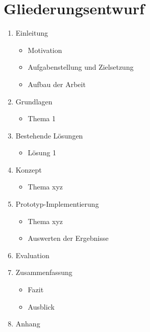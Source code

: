 \section{Gliederungsentwurf}
\begin{enumerate}[topsep=0pt,itemsep=-1ex,partopsep=1ex,parsep=1ex]
\item Einleitung
\begin{itemize}[topsep=0pt,itemsep=-1ex,partopsep=1ex,parsep=1ex]
\item Motivation
\item Aufgabenstellung und Zielsetzung
\item Aufbau der Arbeit
\end{itemize}
\item Grundlagen
\begin{itemize}[topsep=0pt,itemsep=-1ex,partopsep=1ex,parsep=1ex]
\item Thema 1
\end{itemize}
\item Bestehende Lösungen
\begin{itemize}[topsep=0pt,itemsep=-1ex,partopsep=1ex,parsep=1ex]
\item Lösung 1
\end{itemize}
\item Konzept
\begin{itemize}[topsep=0pt,itemsep=-1ex,partopsep=1ex,parsep=1ex]
\item Thema xyz
\end{itemize}
\item Prototyp-Implementierung
\begin{itemize}[topsep=0pt,itemsep=-1ex,partopsep=1ex,parsep=1ex]
\item Thema xyz
\item Auswerten der Ergebnisse
\end{itemize}
\item Evaluation
\item Zusammenfassung
\begin{itemize}[topsep=0pt,itemsep=-1ex,partopsep=1ex,parsep=1ex]
\item Fazit
\item Ausblick
\end{itemize}
\item Anhang
\end{enumerate}
